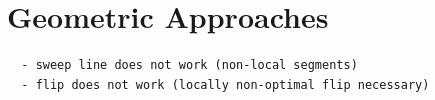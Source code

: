 \section{Geometric Approaches}



\begin{verbatim}
  - sweep line does not work (non-local segments)
  - flip does not work (locally non-optimal flip necessary)
\end{verbatim}

